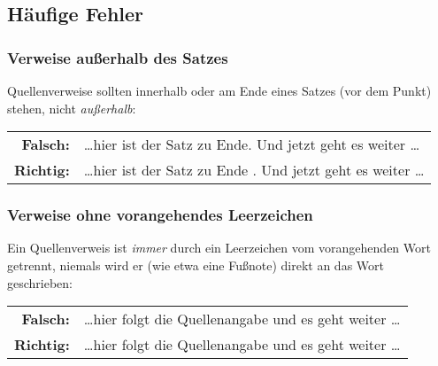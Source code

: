 \subsection{Häufige Fehler}

\subsubsection{Verweise außerhalb des Satzes}
Quellenverweise sollten innerhalb oder am Ende eines Satzes (\dah vor
dem Punkt) stehen, nicht \emph{außerhalb}:
%
\begin{center}
\begin{tabular}{rl}
 \textbf{Falsch:}  & \ldots hier ist der Satz zu Ende. \cite{Oetiker2015} Und jetzt geht es weiter \ldots \\
 \textbf{Richtig:} & \ldots hier ist der Satz zu Ende \cite{Oetiker2015}. Und jetzt geht es weiter \ldots
\end{tabular}
\end{center}

\subsubsection{Verweise ohne vorangehendes Leerzeichen}

Ein Quellenverweis ist \emph{immer} durch ein Leerzeichen vom vorangehenden Wort getrennt, niemals wird er (wie etwa eine Fußnote) direkt an das Wort geschrieben:

\begin{center}
\begin{tabular}{rl}
\textbf{Falsch:}  & \ldots hier folgt die Quellenangabe\cite{Oetiker2015} und es geht weiter \ldots \\
\textbf{Richtig:} & \ldots hier folgt die Quellenangabe \cite{Oetiker2015} und es geht weiter \ldots
\end{tabular}
\end{center}

